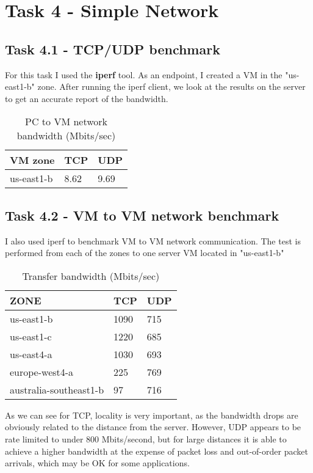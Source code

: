 \documentclass[paper=a4, fontsize=11pt]{scrartcl}
\numberwithin{equation}{section}    %
\numberwithin{figure}{section}      %
\numberwithin{table}{section}       %
\begin{document}
\section{Task 4 - Simple Network}
\subsection{Task 4.1 - TCP/UDP benchmark}

For this task I used the \textbf{iperf} tool.
As an endpoint, I created a VM in the "us-east1-b" zone.
After running the iperf client, we look at the results on the server to get an accurate report of the bandwidth.

\begin{table}[htb]
\centering
\caption{PC to VM network bandwidth (Mbits/sec)}
\begin{tabular}{|l|l|l|}
\hline
VM zone & TCP & UDP \\ \hline
us-east1-b            & 8.62          & 9.69          \\ \hline
\end{tabular}
\end{table}


\subsection{Task 4.2 - VM to VM network benchmark}

I also used iperf to benchmark VM to VM network communication.
The test is performed from each of the zones to one server VM located in "us-east1-b"

\begin{table}[htb]
\centering
\caption{Transfer bandwidth (Mbits/sec)}
\begin{tabular}{|l|l|l|}
\hline
ZONE & TCP & UDP \\ \hline
us-east1-b & 1090 & 715\\ \hline
us-east1-c & 1220 &  685   \\ \hline
us-east4-a & 1030 &  693   \\ \hline
europe-west4-a & 225 &  769   \\ \hline
australia-southeast1-b & 97 &  716   \\ \hline
\end{tabular}
\end{table}

As we can see for TCP, locality is very important, as the bandwidth drops are obviously related to the distance from the server.
However, UDP appears to be rate limited to under 800 Mbits/second, but for large distances it is able to achieve a higher bandwidth at the expense of packet loss and out-of-order packet arrivals, which may be OK for some applications.

\end{document}
